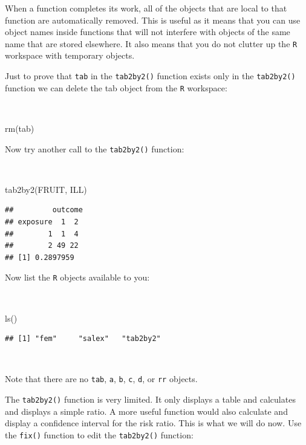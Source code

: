 \documentclass[
  12pt,
]{book}
\newenvironment{Shaded}{\begin{snugshade}}{\end{snugshade}}
\newcommand{\FunctionTok}[1]{\textcolor[rgb]{0.00,0.00,0.00}{#1}}
\newcommand{\NormalTok}[1]{#1}
\begin{document}
When a function completes its work, all of the objects that are local to that function are automatically removed. This is useful as it means that you can use object names inside functions that will not interfere with objects of the same name that are stored elsewhere. It also means that you do not clutter up the \texttt{R} workspace with temporary objects.

Just to prove that \texttt{tab} in the \texttt{tab2by2()} function exists only in the \texttt{tab2by2()} function we can delete the tab object from the \texttt{R} workspace:

~

\begin{Shaded}
\begin{Highlighting}[]
\FunctionTok{rm}\NormalTok{(tab)}
\end{Highlighting}
\end{Shaded}

Now try another call to the \texttt{tab2by2()} function:

~

\begin{Shaded}
\begin{Highlighting}[]
\FunctionTok{tab2by2}\NormalTok{(FRUIT, ILL)}
\end{Highlighting}
\end{Shaded}

\begin{verbatim}
##         outcome
## exposure  1  2
##        1  1  4
##        2 49 22
## [1] 0.2897959
\end{verbatim}

\newpage

Now list the \texttt{R} objects available to you:

~

\begin{Shaded}
\begin{Highlighting}[]
\FunctionTok{ls}\NormalTok{()}
\end{Highlighting}
\end{Shaded}

\begin{verbatim}
## [1] "fem"     "salex"   "tab2by2"
\end{verbatim}

~

Note that there are no \texttt{tab}, \texttt{a}, \texttt{b}, \texttt{c}, \texttt{d}, or \texttt{rr} objects.

The \texttt{tab2by2()} function is very limited. It only displays a table and calculates and displays a simple ratio. A more useful function would also calculate and display a confidence interval for the risk ratio. This is what we will do now. Use the \texttt{fix()} function to edit the \texttt{tab2by2()} function:
\end{document}
